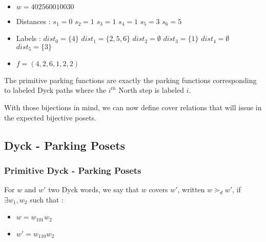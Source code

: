 \begin{example}[$n = 6, \mathcal{LD}_n \to \mathcal{PF}_n$]
    ~\
    \begin{itemize}
        \item $w = 402560010030$
    \end{itemize}
    
    \begin{itemize}
        \item Distances :
            \subitem $s_1 = 0$
            \hspace{2cm} $s_2 = 1$
            \hspace{2cm} $s_3 = 1$
            \subitem $s_4 = 1$
            \hspace{2cm} $s_5 = 3$
            \hspace{2cm} $s_6 = 5$
        \item Labels :
            \subitem $dist_0 = \{4\}$
            \hspace{2cm} $dist_1 = \{2, 5, 6\}$
            \hspace{2cm} $dist_2 = \emptyset$
            \subitem $dist_3 = \{1\}$
            \hspace{2cm} $dist_4 = \emptyset$
            \hspace{32mm} $dist_5 = \{3\}$
        \item $f = (4, 2, 6, 1, 2, 2)$
    \end{itemize}
\end{example}

\begin{rem}
    The primitive parking functions are exactly the
    parking functions corresponding to labeled Dyck paths
    where the $i^{th}$ North step is labeled $i$.
\end{rem}

With those bijections in mind, we can now define cover
relations that will issue in the expected bijective posets.

\subsection{Dyck - Parking Posets}

\subsubsection{Primitive Dyck - Parking Posets}

\begin{definition}[$\gtrdot_d$]
    For $w$ and $w'$ two Dyck words, we say that $w$
    covers $w'$, written $w \gtrdot_d w'$, if
    $\exists w_1, w_2$ such that :
    \begin{itemize}
        \item $w = w_101w_2$
        \item $w' = w_110w_2$
    \end{itemize}  
\end{definition}

